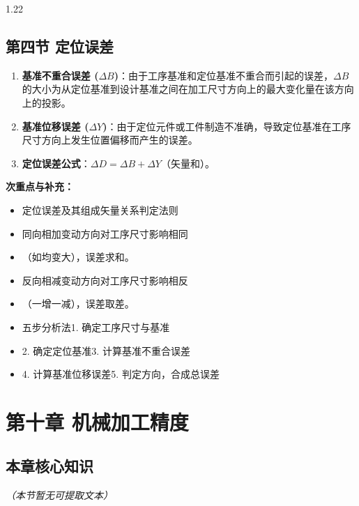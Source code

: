 \documentclass[12pt,a4paper]{article}
\begin{document}
\begin{spacing}{1.22}
\subsection{第四节 定位误差}
\begin{tcolorbox}[colback=yellow!6,colframe=red!55!black,title=重点,left=1mm,right=1mm]
\begin{enumerate}[leftmargin=2.2em,label=\arabic*.]
  \item \textbf{基准不重合误差 ($\Delta B$)}：由于工序基准和定位基准不重合而引起的误差，$\Delta B$ 的大小为从定位基准到设计基准之间在加工尺寸方向上的最大变化量在该方向上的投影。
  \item \textbf{基准位移误差 ($\Delta Y$)}：由于定位元件或工件制造不准确，导致定位基准在工序尺寸方向上发生位置偏移而产生的误差。
  \item \textbf{定位误差公式}：$\Delta D=\Delta B+\Delta Y$（矢量和）。
\end{enumerate}
\end{tcolorbox}
\noindent\textbf{次重点与补充：}
\begin{itemize}[leftmargin=2.2em,label=--]
  \item 定位误差及其组成矢量关系判定法则
  \item 同向相加变动方向对工序尺寸影响相同
  \item （如均变大），误差求和。
  \item 反向相减变动方向对工序尺寸影响相反
  \item （一增一减），误差取差。
  \item 五步分析法1. 确定工序尺寸与基准
  \item 2. 确定定位基准3. 计算基准不重合误差
  \item 4. 计算基准位移误差5. 判定方向，合成总误差
\end{itemize}

\section{第十章 机械加工精度}
\subsection{本章核心知识}
\textit{（本节暂无可提取文本）}


\end{spacing}
\end{document}
